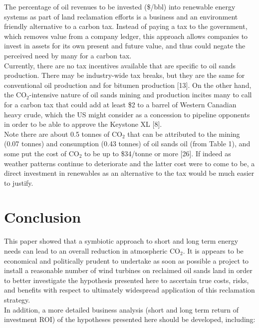 \documentclass[11pt]{article}
\begin{document}
The percentage of oil revenues to be invested (\$/bbl) into renewable energy systems as part of land reclamation efforts is a business and an environment friendly alternative to a carbon tax. Instead of paying a tax to the government, which removes value from a company ledger, this approach allows companies to invest in assets for its own present and future value, and thus could negate the perceived need by many for a carbon tax. \\

Currently, there are no tax incentives available that are specific to oil sands production. There may be industry-wide tax breaks, but they are the same for conventional oil production and for bitumen production [13]. On the other hand, the CO$_2$-intensive nature of oil sands mining and production incites many to call for a carbon tax that could add at least \$2 to a barrel of Western Canadian heavy crude, which the US might consider as a concession to pipeline opponents in order to be able to approve the Keystone XL [8].   \\

Note there are about 0.5 tonnes of CO$_2$ that can be attributed to the mining (0.07 tonnes) and consumption (0.43 tonnes) of oil sands oil (from Table 1), and some put the cost of CO$_2$ to be up to \$34/tonne or more [26]. If indeed as weather patterns continue to deteriorate and the latter cost were to come to be, a direct investment in renewables as an alternative to the tax would be much easier to justify. 


\section{Conclusion}
This paper showed that a symbiotic approach to short and long term energy needs can lead to an overall reduction in atmospheric CO$_2$. It is appears to be economical and politically prudent to undertake as soon as possible a project to install a reasonable number of wind turbines on reclaimed oil sands land in order to better investigate the hypothesis presented here to ascertain true costs, risks, and benefits with respect to ultimately widespread application of this reclamation strategy.\\

In addition, a more detailed business analysis (short and long term return of investment ROI) of the hypotheses presented here should be developed, including:
\end{document}

